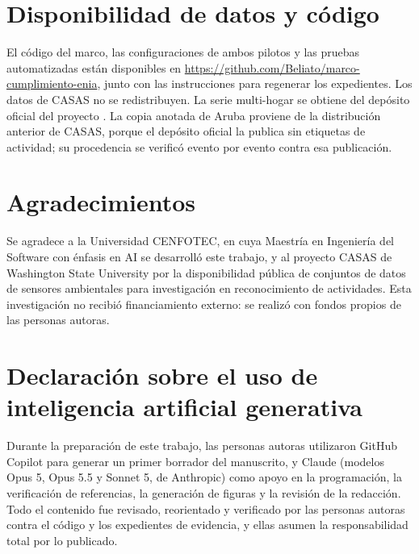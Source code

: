
\section{Disponibilidad de datos y código}

El código del marco, las configuraciones de ambos pilotos y las pruebas
automatizadas están disponibles en
\url{https://github.com/Beliato/marco-cumplimiento-enia}, junto con las
instrucciones para regenerar los expedientes. Los datos de CASAS no se
redistribuyen. La serie multi-hogar se obtiene del depósito oficial del proyecto
\cite{cook2025zenodo}. La copia anotada de Aruba proviene de la distribución
anterior de CASAS, porque el depósito oficial la publica sin etiquetas de
actividad; su procedencia se verificó evento por evento contra esa publicación.

\section{Agradecimientos}

Se agradece a la Universidad CENFOTEC, en cuya Maestría en Ingeniería del Software
con énfasis en AI se desarrolló este trabajo, y al proyecto CASAS de Washington
State University por la disponibilidad pública de conjuntos de datos de sensores
ambientales para investigación en reconocimiento de actividades. Esta
investigación no recibió financiamiento externo: se realizó con fondos propios de
las personas autoras.

\section{Declaración sobre el uso de inteligencia artificial generativa}

Durante la preparación de este trabajo, las personas autoras utilizaron GitHub
Copilot para generar un primer borrador del manuscrito, y Claude (modelos Opus 5, Opus 5.5 y Sonnet 5, de Anthropic) como apoyo
en la programación, la verificación de referencias, la generación de figuras y la
revisión de la redacción. Todo el contenido fue revisado, reorientado y verificado
por las personas autoras contra el código y los expedientes de evidencia, y ellas
asumen la responsabilidad total por lo publicado.
